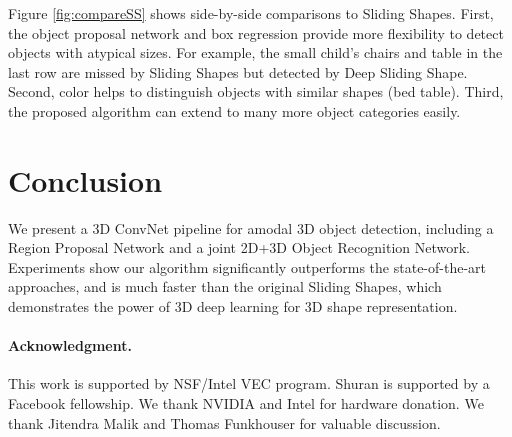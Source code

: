 \documentclass[10pt,twocolumn,letterpaper]{article}
\begin{document}
Figure \ref{fig:compareSS} shows side-by-side comparisons to Sliding Shapes.
First, the object proposal network and box regression provide more flexibility to detect objects with atypical sizes. 
For example, the small child's chairs and table in the last row are missed by Sliding Shapes but detected by Deep Sliding Shape.
Second, color helps to distinguish objects with similar shapes (\eg bed \vs table).
Third, the proposed algorithm can extend to many more object categories easily.


\vspace{-2mm}
\section{Conclusion}
\vspace{-2mm}

We present a 3D ConvNet pipeline for amodal 3D object detection, including a Region Proposal Network and a joint 2D+3D Object Recognition Network.
Experiments show our algorithm significantly outperforms the state-of-the-art approaches,
and is much faster than the original Sliding Shapes, which demonstrates the power of 3D deep learning for 3D shape representation.

\vspace{-2mm}
\paragraph{Acknowledgment.}
This work is supported by NSF/Intel VEC program. 
Shuran is supported by a Facebook fellowship.
We thank NVIDIA and Intel for hardware donation.
We thank Jitendra Malik and Thomas Funkhouser for valuable discussion.


\vspace{-2mm}
{\small


}
\end{document}
